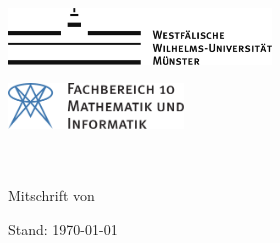 \begin{titlepage}
\pagestyle{empty}
\begin{center}
\begin{minipage}{0.4\textwidth}
\begin{flushleft}
\includegraphics[height=1.5cm,keepaspectratio]{../!config/Bilder/wwulogo.pdf}
\end{flushleft}
\end{minipage}
\hfill
\begin{minipage}{0.4\textwidth}
\begin{flushright}
\vspace*{0.3cm}
\includegraphics[height=1.2cm,keepaspectratio]{../!config/Bilder/fb10logo.pdf} \
\end{flushright}
\end{minipage}

\vspace*{8cm}
\textbf{\Huge{\dertitel}} \\
\vspace{0.2cm} 
\textbf{{\LARGE \dersubtitel}} \\
\vspace{0.6cm}
\LARGE{Mitschrift von \derautor} \\
\vspace{0.6cm}
\LARGE{\dasdatum}

\vfill

\vspace*{2cm}
\begin{flushright}
{\footnotesize Stand: \today}
\end{flushright}
\end{center}
\end{titlepage}